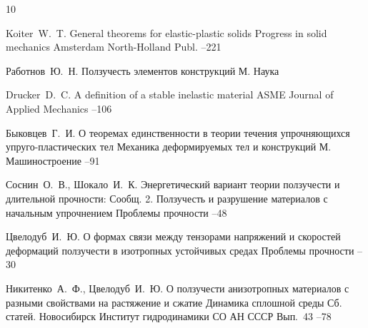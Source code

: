 \begin{thebibliography}{10}

\by Koiter~W.~T.
\paper   General theorems for elastic-plastic solids
\inbook  Progress in solid mechanics
\publaddr Amsterdam
\publ North-Holland Publ.
--221


\by Работнов~Ю.~Н.
\book    Ползучесть элементов конструкций
\publaddr М.
\publ Наука

\by Drucker~D.~C.
\paper A definition of a stable inelastic material
\jour ASME Journal of Applied Mechanics
--106


\by Быковцев~Г.~И.
\paper О теоремах единственности в теории течения упрочняющихся упруго-пластических тел
\inbook Механика деформируемых тел и конструкций
\publaddr М.
\publ Машиностроение
--91

\by Соснин~О.~В., Шокало~И.~К.
\paper  Энергетический вариант теории ползучести и длительной прочности: Сообщ. 2. Ползучесть и разрушение материалов с начальным упрочнением
\jour Проблемы прочности
--48


\by Цвелодуб~И.~Ю.
\paper О формах связи между тензорами напряжений и скоростей деформаций ползучести в изотропных устойчивых средах
\jour Проблемы прочности
--30
%


    
\by Никитенко~А.~Ф., Цвелодуб~И.~Ю.
\paper О ползучести анизотропных материалов с разными свойствами на растяжение и сжатие
\inbook Динамика сплошной среды
\bookinfo Сб. статей. 
\publaddr Новосибирск
\publ Институт гидродинамики СО АН СССР
\volinfo Вып.~43
--78
    

\end{thebibliography}
